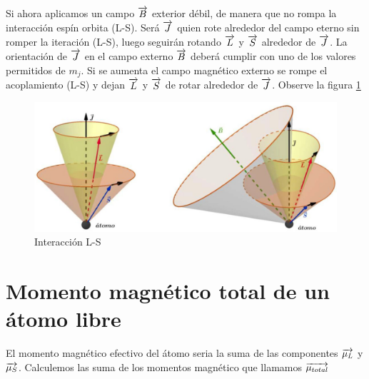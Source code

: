 Si ahora aplicamos un campo $\overrightarrow{B}$ exterior débil, de manera que no rompa la interacción espín orbita (L-S). Será $\overrightarrow{J}$ quien rote alrededor del campo eterno sin romper la iteración (L-S), luego seguirán rotando $\overrightarrow{L}$ y $\overrightarrow{S}$ alrededor de $\overrightarrow{J}$. La orientación de $\overrightarrow{J}$ en el campo externo $\overrightarrow{B}$  deberá cumplir con uno de los valores permitidos de $m_{j}$. Si se aumenta el campo magnético externo se rompe el acoplamiento (L-S) y dejan $\overrightarrow{L}$ y $\overrightarrow{S}$ de rotar alrededor de $\overrightarrow{J}$. Observe la figura \ref{fig:116} 


\begin{figure}[H]
    \centering
    \includegraphics[width=1.0\textwidth]{./Figures/fig116}
	\caption{Interacción L-S}
	\label{fig:116}
 \end{figure}


\section{Momento magnético total de un átomo libre}

El momento magnético efectivo del átomo seria la suma de las componentes $\overrightarrow{\mu_{L}}$ y $\overrightarrow{\mu_{S}}$. Calculemos las suma de los momentos magnético que llamamos $\overrightarrow{\mu_{total}}$

